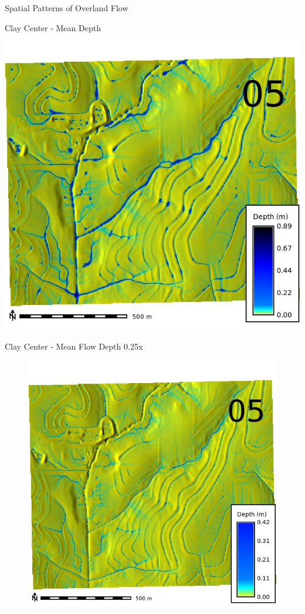 \documentclass[
  ignorenonframetext,
]{beamer}
\begin{document}
\begin{frame}{Spatial Patterns of Overland Flow}
\begin{block}{Clay Center - Mean Depth}
\includegraphics{../output/clay-center/sensitivity_1/clay-center_depth_1_4_s_average.webp}
\end{block}

\begin{block}{Clay Center - Mean Flow Depth}
\label{clay-center---mean-flow-depth}
0.25x

\begin{figure}[H]

{\centering \includegraphics{../output/clay-center/sensitivity_1/clay-center_depth_1_025_s_average.webp}

}
\end{figure}
\end{block}
\end{frame}
\end{document}
